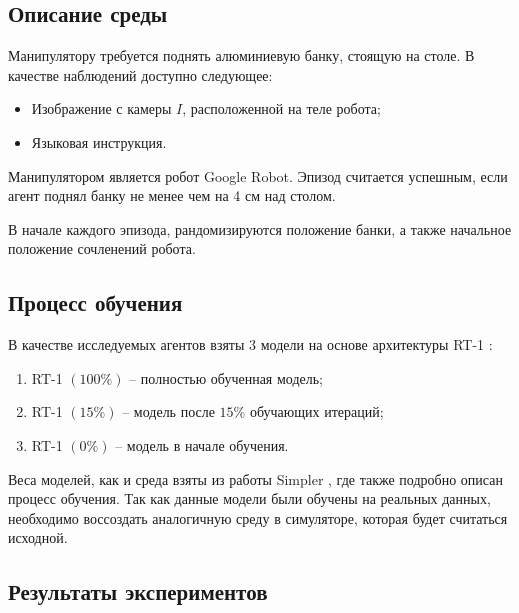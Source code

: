         \subsection{Описание среды}

            Манипулятору требуется поднять алюминиевую банку, стоящую на столе. В качестве наблюдений доступно следующее:

            \begin{itemize}
                \item Изображение с камеры $I$, расположенной на теле робота;
                \item Языковая инструкция.
            \end{itemize}

            Манипулятором является робот Google Robot. Эпизод считается успешным, если агент поднял банку не менее чем на 4 см над столом. 
            
            В начале каждого эпизода, рандомизируются положение банки, а также начальное положение сочленений робота. 

        \subsection{Процесс обучения}

            В качестве исследуемых агентов взяты 3 модели на основе архитектуры RT-1 \cite{brohan2023rt1roboticstransformerrealworld}:

            \begin{enumerate}
                \item RT-1 $(100\%)$ -- полностью обученная модель;
                \item RT-1 $(15\%)$ -- модель после $15\%$ обучающих итераций;
                \item RT-1 $(0\%)$ -- модель в начале обучения.
            \end{enumerate}
            
            Веса моделей, как и среда взяты из работы Simpler \cite{li24simpler}, где также подробно описан процесс обучения. Так как данные модели были обучены на реальных данных, необходимо воссоздать аналогичную среду в симуляторе, которая будет считаться исходной. 

        \subsection{Результаты экспериментов}


